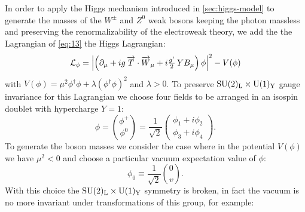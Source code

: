 In order to apply the Higgs mechanism introduced in \cref{sec:higgs-model} to
generate the masses of the $W^\pm$ and $Z^0$ weak bosons keeping the photon
massless and preserving the renormalizability of the electroweak theory, we add
the the Lagrangian of \cref{eq:13} the Higgs Lagrangian:
\begin{equation}
  \label{eq:45}
  \mathcal{L}_{\phi} = \left| \left(\partial_{\mu} + i g\, \overrightarrow{T} \cdot
      \overrightarrow{W}_{\mu} + i \tfrac{g'}{2}\,Y B_{\mu} \right)\phi \right|^2 - V(\phi)
\end{equation}
with
$V(\phi) = \mu^{2}\phi^{\dagger} \phi + \lambda ( \phi^{\dagger} \phi )^{2}$ and
$\lambda > 0$. To preserve $\mathrm{SU}(2)_\mathrm{L} \times \mathrm{U}(1)_\mathrm{Y}$ gauge invariance for this
Lagrangian we choose four fields to be arranged in an isospin doublet with
hypercharge $Y = 1$:
 \begin{equation}
  \label{eq:46}
  \phi = \binom{\phi^{+}}{\phi^{0}} =
  \frac{1}{\sqrt{2}}
  \begin{pmatrix}
    \phi_{1} + i \phi_{2} \\
    \phi_{3} + i \phi_{4}
  \end{pmatrix}.
\end{equation}
To generate the boson masses we consider the case where in the potential
$V(\phi)$ we have $\mu^2 < 0$ and choose a particular vacuum expectation value
of $\phi$:
\begin{equation}
  \label{eq:47}
  \phi_{0} \equiv \frac{1}{\sqrt{2}} \binom{0}{v}.
\end{equation}
With this choice the $\mathrm{SU}(2)_\mathrm{L} \times \mathrm{U}(1)_\mathrm{Y}$ symmetry is broken, in fact the
vacuum is no more invariant under transformations of this group, for example:
